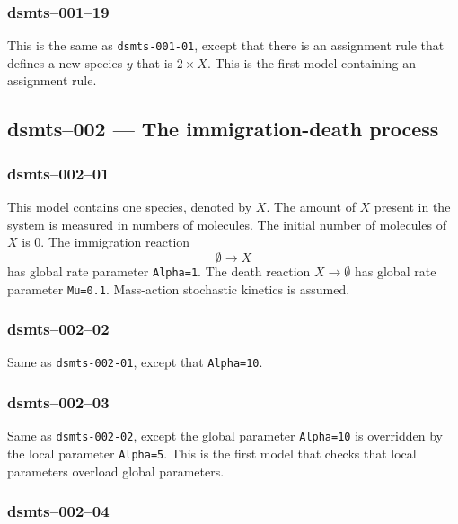 
\subsubsection{dsmts--001--19}

This is the same as \verb$dsmts-001-01$, except that 
there is an assignment rule that defines a new species $y$ that is
$2\times X$. This is the first model containing an assignment rule.




\subsection{dsmts--002 --- The immigration-death process}

\subsubsection{dsmts--002--01}

This model contains one species, denoted by $X$. The amount of $X$
present in the system is measured in numbers of molecules. The initial
number of molecules of $X$ is $0$. The immigration reaction
\[
\emptyset \longrightarrow X
\] 
has global rate parameter
\texttt{Alpha=1}. The death reaction $X\longrightarrow \emptyset$ has
global rate parameter \texttt{Mu=0.1}. Mass-action stochastic kinetics
is assumed.


\subsubsection{dsmts--002--02} 

Same as \verb$dsmts-002-01$, except that
\verb$Alpha=10$. 


\subsubsection{dsmts--002--03} 

Same as \verb$dsmts-002-02$, except the global parameter
\verb$Alpha=10$ is overridden by the local parameter
\verb$Alpha=5$. This is the first model that checks that local
parameters overload global parameters.


\subsubsection{dsmts--002--04}

